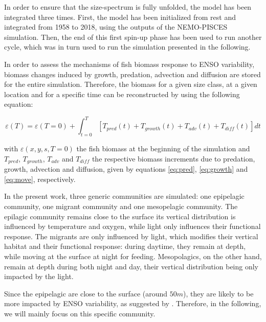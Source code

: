 In order to ensure that the size-spectrum is fully unfolded, the model has been integrated three times. First, the model has been initialized from rest and integrated from 1958 to 2018, using the outputs of the NEMO-PISCES simulation. Then, the end of this first spin-up phase has been used to run another cycle, which was in turn used to run the simulation presented in the following.

In order to assess the mechanisms of fish biomass response to ENSO variability, biomass changes induced by growth, predation, advection and diffusion are stored for the entire simulation. Therefore, the biomass for a given size class, at a given location and for a specific time can be reconstructed by using the following equation:

\begin{equation}
\varepsilon(T) = \varepsilon(T=0) + \int_{t=0}^{T} \left[ 
T_{pred}(t) +
T_{growth}(t) + 
T_{adv}(t) + 
T_{diff}(t) 
\right] dt 
\label{eq:rec_oope}
\end{equation}

with $\varepsilon(x,y,s,T=0)$ the fish biomass at the beginning of the simulation and $T_{pred}$, $T_{growth}$, $T_{adv}$ and $T_{diff}$ the respective biomass increments due to predation, growth, advection and diffusion, given by equations \ref{eq:pred}, \ref{eq:growth} and \ref{eq:move}, respectively.

In the present work, three generic communities are simulated: one epipelagic community, one migrant community and one mesopelagic community. The epilagic community remains close to the surface its vertical distribution is influenced by temperature and oxygen, while light only influences their functional response. The migrants are only influenced by light, which modifies their vertical habitat and their functional response: during daytime, they remain at depth, while moving at the surface at night for feeding. Mesopolagics, on the other hand, remain at depth during both night and day, their vertical distribution being only impacted by the light. 

Since the epipelagic are close to the surface (around $50m$), they are likely to be more impacted by ENSO variability, as suggested by \cite{lemezoNaturalVariabilityMarine2016}. Therefore, in the following, we will mainly focus on this specific community. 

